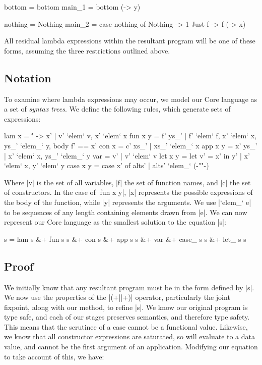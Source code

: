 \documentclass[preprint]{sigplanconf}
\begin{document}
\begin{code}
bottom = bottom
main_1 = bottom (\y -> y)

nothing = Nothing
main_2 = case  nothing of
               Nothing  -> 1
               Just f   -> f (\x -> x)
\end{code}

All residual lambda expressions within the resultant program will be one of these forms, assuming the three restrictions outlined above.

\subsection{Notation}

To examine where lambda expressions may occur, we model our Core language as a set of \textit{syntax trees}. We define the following rules, which generate sets of expressions:

\ignore\begin{code}
lam x     = {\v' -> x' | v' `elem` v, x' `elem` x}
fun x y   = {f' ys_' | f' `elem` f, x' `elem` x, ys_' `elem_` y, body f' == x'}
con x     = {c' xs_' | xs_' `elem_` x}
app x y   = {x' ys_' | x' `elem` x, ys_' `elem_` y}
var       = {v' | v' `elem` v}
let x y   = {let v' = x' in y' | x' `elem` x, y' `elem` y}
case x y  = {case x' of alts' | alts' `elem_` ({-""-})}
\end{code}

Where |v| is the set of all variables, |f| the set of function names, and |c| the set of constructors. In the case of |fun x y|, |x| represents the possible expressions of the body of the function, while |y| represents the arguments. We use |`elem_` e| to be sequences of any length containing elements drawn from |e|. We can now represent our Core language as the smallest solution to the equation |s|:

\ignore\begin{code}
s  =  lam s &+ fun s s &+ con s &+ app s s &+ var &+
      case_ s s &+ let_ s s
\end{code}

\subsection{Proof}

We initially know that any resultant program must be in the form defined by |s|. We now use the properties of the |(+||+)| operator, particularly the joint fixpoint, along with our method, to refine |s|. We know our original program is type safe, and each of our stages preserves semantics, and therefore type safety. This means that the scrutinee of a case cannot be a functional value. Likewise, we know that all constructor expressions are saturated, so will evaluate to a data value, and cannot be the first argument of an application. Modifying our equation to take account of this, we have:
\end{document}
